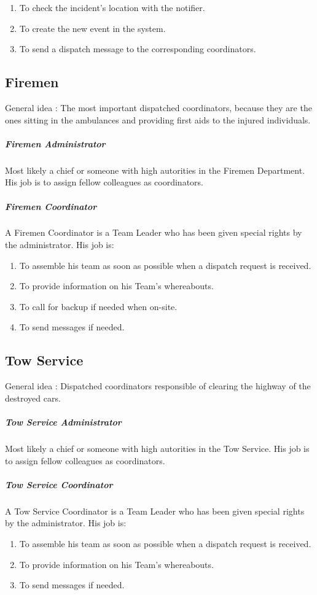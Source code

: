 \begin{enumerate}
\item To check the incident's location with the notifier.
\item To create the new event in the system.
\item To send a dispatch message to the corresponding coordinators.
\end{enumerate}


\subsection{Firemen}
General idea : The most important dispatched coordinators, because they are the
ones sitting in the ambulances and providing first aids to the injured individuals.

\subparagraph{Firemen Administrator}
Most likely a chief or someone with high autorities in the Firemen Department.
His job is to assign fellow colleagues as coordinators.

\subparagraph{Firemen Coordinator}
A Firemen Coordinator is a Team Leader who has been given special
rights by the administrator. His job is:

\begin{enumerate}
\item To assemble his team as soon as possible when a dispatch request is
received.
\item To provide information on his Team's whereabouts.
\item To call for backup if needed when on-site.
\item To send messages if needed.
\end{enumerate}

\subsection{Tow Service}
General idea : Dispatched coordinators responsible of clearing the highway of
the destroyed cars.

\subparagraph{Tow Service Administrator}
Most likely a chief or someone with high autorities in the Tow Service.
His job is to assign fellow colleagues as coordinators.

\subparagraph{Tow Service Coordinator}
A Tow Service Coordinator is a Team Leader who has been given special
rights by the administrator. His job is:

\begin{enumerate}
\item To assemble his team as soon as possible when a dispatch request is
received.
\item To provide information on his Team's whereabouts.
\item To send messages if needed.
\end{enumerate}

